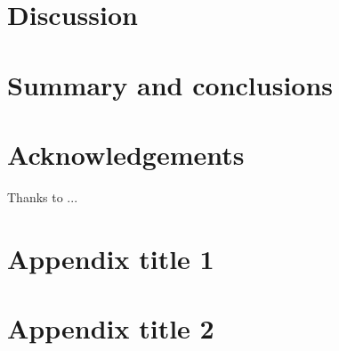 \documentclass[final,5p,times,twocolumn,authoryear]{elsarticle}
\begin{document}
\section{Discussion}
\lipsum[4]

\section{Summary and conclusions}
\lipsum[1-4]


\section*{Acknowledgements}
Thanks to ...

\appendix

\section{Appendix title 1}

\section{Appendix title 2}

%  
 







\end{document}

